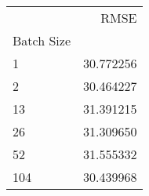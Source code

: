 \begin{tabular}{lr}
\toprule
 & RMSE \\
Batch Size &  \\
\midrule
1 & 30.772256 \\
2 & 30.464227 \\
13 & 31.391215 \\
26 & 31.309650 \\
52 & 31.555332 \\
104 & 30.439968 \\
\bottomrule
\end{tabular}

